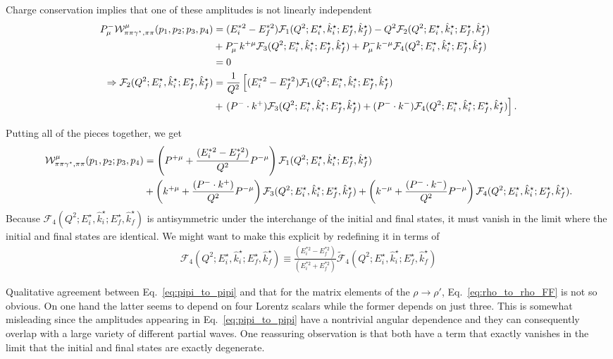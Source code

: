 Charge conservation implies that one of these amplitudes is not linearly independent
\begin{align}
P^-_\mu{\mathcal{W}}^{\mu}_{\pi\pi\gamma^\star,\pi\pi}(p_1,p_2;p_3,p_4)
&=
(E_i^{*2}-E_f^{*2})\mathcal{F}_{1}(Q^2;E_i^\star,\hat{k}_i^\star;E_f^\star,\hat{k}_f^\star)
-Q^2 \mathcal{F}_{2}(Q^2;E_i^\star,\hat{k}_i^\star;E_f^\star,\hat{k}_f^\star)
\nonumber\\
&+
P^-_\mu k^{+\mu}\mathcal{F}_{3}(Q^2;E_i^\star,\hat{k}_i^\star;E_f^\star,\hat{k}_f^\star)
+
P^-_\mu k^{-\mu}\mathcal{F}_{4}(Q^2;E_i^\star,\hat{k}_i^\star;E_f^\star,\hat{k}_f^\star)
\\
&=0
\\
\Rightarrow
\mathcal{F}_{2}(Q^2;E_i^\star,\hat{k}_i^\star;E_f^\star,\hat{k}_f^\star)
&=\frac{1}{Q^2}
\left[
(E_i^{*2}-E_f^{*2})\mathcal{F}_{1}(Q^2;E_i^\star,\hat{k}_i^\star;E_f^\star,\hat{k}_f^\star)
\right.
\nonumber\\
&+
\left.
(P^-\cdot k^{+})\mathcal{F}_{3}(Q^2;E_i^\star,\hat{k}_i^\star;E_f^\star,\hat{k}_f^\star)
+
(P^-\cdot k^{-})\mathcal{F}_{4}(Q^2;E_i^\star,\hat{k}_i^\star;E_f^\star,\hat{k}_f^\star)
\right].
\end{align}

Putting all of the pieces together, we get
\begin{align}
{\mathcal{W}}^{\mu}_{\pi\pi\gamma^\star,\pi\pi}(p_1,p_2;p_3,p_4)&=
\left(P^{+\mu}+\frac{(E_i^{*2}-E_f^{*2})}{Q^2} P^{-\mu}\right)\mathcal{F}_{1}(Q^2;E_i^\star,\hat{k}_i^\star;E_f^\star,\hat{k}_f^\star)
\nonumber\\
&+
\left(k^{+\mu}+\frac{(P^-\cdot k^{+})}{Q^2} P^{-\mu}\right)
\mathcal{F}_{3}(Q^2;E_i^\star,\hat{k}_i^\star;E_f^\star,\hat{k}_f^\star)
+
\left(k^{-\mu}+\frac{(P^-\cdot k^{-})}{Q^2} P^{-\mu}\right)
\mathcal{F}_{4}(Q^2;E_i^\star,\hat{k}_i^\star;E_f^\star,\hat{k}_f^\star).
\label{eq:pipi_to_pipi}
\end{align}
Because $\mathcal{F}_{4}(Q^2;E_i^\star,\hat{k}_i^\star;E_f^\star,\hat{k}_f^\star)$ is antisymmetric under the interchange of the initial and final states, it must vanish in the limit where the initial and final states are identical. We might want to make this explicit by redefining it in terms of 
\begin{align}
\mathcal{F}_{4}(Q^2;E_i^\star,\hat{k}_i^\star;E_f^\star,\hat{k}_f^\star)
\equiv 
\frac{(E_i^{*2}-E_f^{*2})}{(E_i^{*2}+E_f^{*2})}
\widetilde{\mathcal{F}}_{4}(Q^2;E_i^\star,\hat{k}_i^\star;E_f^\star,\hat{k}_f^\star)
\end{align}


Qualitative agreement between Eq.~\ref{eq:pipi_to_pipi} and that for the matrix elements of the $\rho\to\rho'$, Eq.~\ref{eq:rho_to_rho_FF} is not so obvious. On one hand the latter seems to depend on four Lorentz scalars while the former depends on just three. This is somewhat misleading since the amplitudes appearing in Eq.~\ref{eq:pipi_to_pipi} have a nontrivial angular dependence and they can consequently overlap with a large variety of different partial waves. One reassuring observation is that both have a term that exactly vanishes in the limit that the initial and final states are exactly degenerate. 


